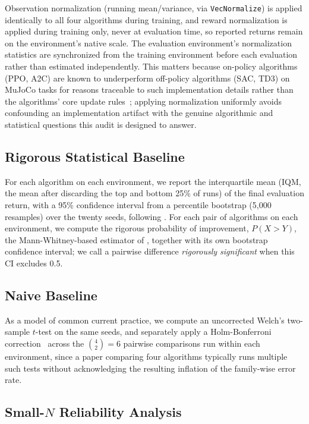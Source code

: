 \documentclass[journal]{IEEEtran}
\begin{document}
Observation normalization (running mean/variance, via \texttt{VecNormalize}) is applied
identically to all four algorithms during training, and reward normalization is applied during
training only, never at evaluation time, so reported returns remain on the environment's native
scale. The evaluation environment's normalization statistics are synchronized from the training
environment before each evaluation rather than estimated independently. This matters because
on-policy algorithms (PPO, A2C) are known to underperform off-policy algorithms (SAC, TD3) on
MuJoCo tasks for reasons traceable to such implementation details rather than the algorithms'
core update rules~\cite{engstrom2020implementation}; applying normalization uniformly avoids
confounding an implementation artifact with the genuine algorithmic and statistical questions this
audit is designed to answer.

\subsection{Rigorous Statistical Baseline}

For each algorithm on each environment, we report the interquartile mean (IQM, the mean after
discarding the top and bottom 25\% of runs) of the final evaluation return, with a 95\% confidence
interval from a percentile bootstrap (5{,}000 resamples) over the twenty seeds, following
\cite{agarwal2021deep}. For each pair of algorithms on each environment, we compute the rigorous
probability of improvement, $P(X > Y)$, the Mann-Whitney-based estimator of
\cite{agarwal2021deep}, together with its own bootstrap confidence interval; we call a pairwise
difference \emph{rigorously significant} when this CI excludes 0.5.

\subsection{Naive Baseline}

As a model of common current practice, we compute an uncorrected Welch's two-sample $t$-test on
the same seeds, and separately apply a Holm-Bonferroni correction~\cite{holm1979sequentially}
across the $\binom{4}{2}=6$ pairwise comparisons run within each environment, since a paper
comparing four algorithms typically runs multiple such tests without acknowledging the resulting
inflation of the family-wise error rate.

\subsection{Small-$N$ Reliability Analysis}
\label{sec:smalln}
\end{document}
